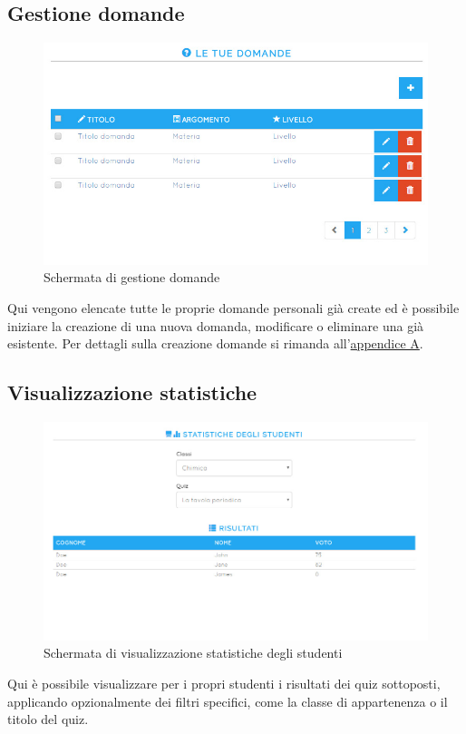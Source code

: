 \documentclass[a4paper, titlepage]{article}
\begin{document}
	 \newpage
	 \subsection{Gestione domande}
	 \begin{figure}[!h]
	 	\centering
	 	\includegraphics[scale=0.33]{Img/screen_gestioneDomande.png}
	 	\caption{Schermata di gestione domande}
	 \end{figure}
	 Qui vengono elencate tutte le proprie domande personali già create ed è possibile iniziare la creazione di una nuova domanda, modificare o eliminare una già esistente. Per dettagli sulla creazione domande si rimanda all'\hyperref[domande]{appendice A}.
	 
	 \subsection{Visualizzazione statistiche}
	 \begin{figure}[!h]
	 	\centering
	 	\includegraphics[scale=0.33]{Img/screen_StatisticheStudenti.png}
	 	\caption{Schermata di visualizzazione statistiche degli studenti}
	 \end{figure}
	 Qui è possibile visualizzare per i propri studenti i risultati dei quiz sottoposti, applicando opzionalmente dei filtri specifici, come la classe di appartenenza o il titolo del quiz.
	 
\end{document}
